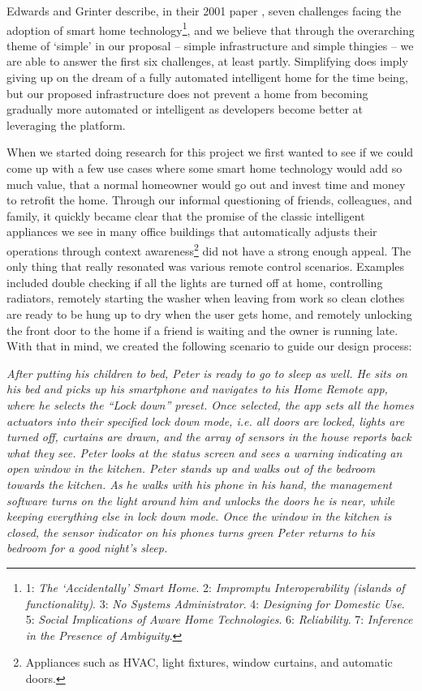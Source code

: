 \documentclass{ubicomp2012}
\begin{document}
Edwards and Grinter describe, in their 2001 paper \cite{Edwards01athome}, seven challenges facing the adoption of smart home technology\footnote{1: \textit{The `Accidentally' Smart Home}. 2: \textit{Impromptu Interoperability (islands of functionality)}. 3: \textit{No Systems Administrator}. 4: \textit{Designing for Domestic Use}. 5: \textit{Social Implications of Aware Home Technologies}. 6: \textit{Reliability}. 7: \textit{Inference in the Presence of Ambiguity}.}, and we believe that through the overarching theme of `simple' in our proposal -- simple infrastructure and simple thingies -- we are able to answer the first six challenges, at least partly. Simplifying does imply giving up on the dream of a fully automated intelligent home for the time being, but our proposed infrastructure does not prevent a home from becoming gradually more automated or intelligent as developers become better at leveraging the platform.

When we started doing research for this project we first wanted to see if we could come up with a few use cases where some smart home technology would add so much value, that a normal homeowner would go out and invest time and money to retrofit the home. Through our informal questioning of friends, colleagues, and family, it quickly became clear that the promise of the classic intelligent appliances we see in many office buildings that automatically adjusts their operations through context awareness\footnote{Appliances such as HVAC, light fixtures, window curtains, and automatic doors.} did not have a strong enough appeal. The only thing that really resonated was various remote control scenarios. Examples included double checking if all the lights are turned off at home, controlling radiators, remotely starting the washer when leaving from work so clean clothes are ready to be hung up to dry when the user gets home, and remotely unlocking the front door to the home if a friend is waiting and the owner is running late. With that in mind,  we created the following scenario to guide our design process:

\textit{After putting his children to bed, Peter is ready to go to sleep as well. He sits on his bed and picks up his smartphone and navigates to his Home Remote app, where he selects the ``Lock down'' preset. Once selected, the app sets all the homes  actuators into their specified lock down mode, i.e. all doors are locked, lights are turned off, curtains are drawn, and the array of sensors in the house reports back what they see. Peter looks at the status screen and sees a warning indicating an open window in the kitchen. Peter stands up and walks out of the bedroom towards the kitchen. As he walks with his phone in his hand, the management software turns on the light around him and unlocks the doors he is near, while keeping everything else in lock down mode. Once the window in the kitchen is closed, the sensor indicator on his phones turns green Peter returns to his bedroom for a good night's sleep.}
\end{document}
